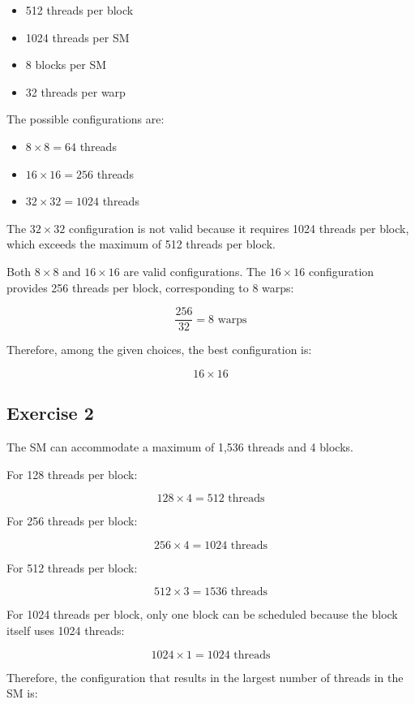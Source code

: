 \documentclass[11pt]{article}
\begin{document}
\begin{itemize}
    \item 512 threads per block
    \item 1024 threads per SM
    \item 8 blocks per SM
    \item 32 threads per warp
\end{itemize}

The possible configurations are:

\begin{itemize}
    \item $8\times8 = 64$ threads
    \item $16\times16 = 256$ threads
    \item $32\times32 = 1024$ threads
\end{itemize}

The $32\times32$ configuration is not valid because it requires 1024
threads per block, which exceeds the maximum of 512 threads per block.

Both $8\times8$ and $16\times16$ are valid configurations. The
$16\times16$ configuration provides 256 threads per block, corresponding
to 8 warps:

\[
\frac{256}{32}=8\text{ warps}
\]

Therefore, among the given choices, the best configuration is:

\[
\boxed{16\times16}
\]

\subsection{Exercise 2}

The SM can accommodate a maximum of 1,536 threads and 4 blocks.

For 128 threads per block:

\[
128\times4=512\text{ threads}
\]

For 256 threads per block:

\[
256\times4=1024\text{ threads}
\]

For 512 threads per block:

\[
512\times3=1536\text{ threads}
\]

For 1024 threads per block, only one block can be scheduled because
the block itself uses 1024 threads:

\[
1024\times1=1024\text{ threads}
\]

Therefore, the configuration that results in the largest number of
threads in the SM is:
\end{document}
